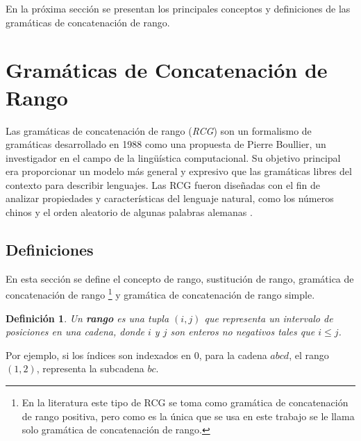 \documentclass{article}
\newtheorem{definition}{Definición}
\begin{document}
En la próxima sección se presentan los principales conceptos y definiciones de las gramáticas de concatenación de rango.

\section{Gramáticas de Concatenación de Rango}
\label{sec:RCG}

Las gramáticas de concatenación de rango (\textit{RCG}) \cite{mainRCGBib} son un formalismo de gramáticas desarrollado
en 1988 como una propuesta de Pierre Boullier, un investigador en el campo de la lingüística computacional. Su objetivo
principal era proporcionar un modelo más general y expresivo que las gramáticas libres del contexto para describir
lenguajes.  Las RCG fueron diseñadas con el fin de analizar propiedades y características del lenguaje natural, como los números
chinos y el orden aleatorio de algunas palabras alemanas \cite{boullier1999chinese}.

\subsection{Definiciones}

En esta sección se define el concepto de rango, sustitución de rango, gramática de concatenación de rango \footnote{En la literatura este tipo de RCG se toma como gramática de concatenación de rango positiva, pero como es la única que
    se usa en este trabajo se le llama solo gramática de concatenación de rango.} y gramática de concatenación de rango simple.

\begin{definition}
    Un \textbf{rango} es una tupla $(i, j)$ que representa un intervalo de posiciones en una cadena, donde $i$ y $j$ son enteros no negativos tales que $i \leq j$.
\end{definition}

Por ejemplo, si los índices son indexados en 0, para la cadena $abcd$, el rango $(1,2)$, representa la subcadena $bc$.
\end{document}
